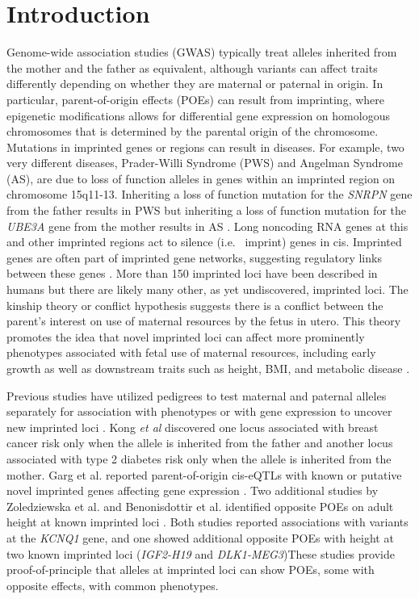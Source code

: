 \section{Introduction}\label{ch02-introduction}
Genome-wide association studies (GWAS) typically treat alleles inherited from the mother and the father as equivalent, although variants can affect traits differently depending on whether they are maternal or paternal in origin. In particular, parent-of-origin effects (POEs) can result from imprinting, where epigenetic modifications allows for differential gene expression on homologous chromosomes that is determined by the parental origin of the chromosome. Mutations in imprinted genes or regions can result in diseases. For example, two very different diseases, Prader-Willi Syndrome (PWS) and Angelman Syndrome (AS), are due to loss of function alleles in genes within an imprinted region on chromosome 15q11-13. Inheriting a loss of function mutation for the \emph{SNRPN} gene from the father results in PWS but inheriting a loss of function mutation for the \emph{UBE3A} gene from the mother results in AS \citep{Peters2014,Falls1999}.  Long noncoding RNA genes at this and other imprinted regions act to silence (i.e.~ imprint) genes in cis. Imprinted genes are often part of imprinted gene networks, suggesting regulatory links between these genes \cite{Patten:2016cb,Gabory:2009be,Varrault:2006kn}. More than 150 imprinted loci have been described in humans \cite{Benonisdottir:2016dz} but there are likely many other, as yet undiscovered, imprinted loci. The kinship theory or conflict hypothesis suggests there is a conflict between the parent's interest on use of maternal resources by the fetus in utero. This theory promotes the idea that novel imprinted loci can affect more prominently phenotypes associated with fetal use of maternal resources, including early growth as well as downstream traits such as height, BMI, and metabolic disease \citep{Peters2014}.

Previous studies have utilized pedigrees to test maternal and paternal alleles separately for association with phenotypes or with gene expression to uncover new imprinted loci \citep{Kong:2009kk,Baran:2015cx,Garg2012a,Paper2014b,Benonisdottir:2016dz}. Kong \emph{et al} \citep{Kong:2009kk} discovered one locus associated with breast cancer risk only when the allele is inherited from the father and another locus associated with type 2 diabetes risk only when the allele is inherited from the mother. Garg et al. reported parent-of-origin cis-eQTLs with known or putative novel imprinted genes affecting gene expression \citep{Garg2012a}. Two additional studies by Zoledziewska et al. and Benonisdottir et al. identified opposite POEs on adult height at known imprinted loci \citep{Zoledziewska:2015do,Benonisdottir:2016dz}. Both studies reported associations with variants at the \emph{KCNQ1} gene, and one showed additional opposite POEs with height at two known imprinted loci (\emph{IGF2-H19} and \emph{DLK1-MEG3})\citep{Benonisdottir:2016dz}These studies provide proof-of-principle that alleles at imprinted loci can show POEs, some with opposite effects, with common phenotypes. 

